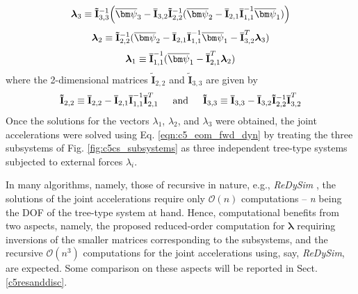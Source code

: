 {	\begin{equation}
	\label{eqn:c5_lamda3_CS}
	\mbox{\boldmath$\lambda$}_3 \equiv \mathbf{\tilde{I}}_{3,3}^{-1}\Big(\mbox{$\overline{\bm\psi}_3$} - \mathbf{\overline{I}}_{3,2}\mathbf{\tilde{I}}_{2,2}^{-1}(\mbox{$\overline{\bm\psi}_2$} - \mathbf{\overline{I}}_{2,1} \mathbf{\overline{I}}_{1,1}^{-1}\mbox{$\overline{\bm\psi}_1$})\Big)\\
	\end{equation}
	\begin{equation}
	\label{eqn:c5_lamda2_CS}
	\mbox{\boldmath$\lambda$}_2 \equiv \mathbf{\tilde{I}}_{2,2}^{-1}(\mbox{$\overline{\bm\psi}_2$} - \mathbf{\overline{I}}_{2,1} \mathbf{\overline{I}}_{1,1}^{-1}\mbox{$\overline{\bm\psi}_1$} - \mathbf{\overline{I}}_{3,2}^T\mbox{\boldmath$\lambda$}_3)\\
	\end{equation}
	\begin{equation}
	\label{eqn:c5_lamda1_CS}
	\mbox{\boldmath$\lambda$}_1 \equiv \mathbf{\overline{I}}_{1,1}^{-1}(\mbox{$\overline{\bm\psi}_1$} - \mathbf{\overline{I}}_{2,1}^T\mbox{\boldmath$\lambda$}_2)\\
	\end{equation}
	where the 2-dimensional matrices $\mathbf{\tilde{I}}_{2,2}$ and $\mathbf{\tilde{I}}_{3,3}$ are given by
	\vspace{-10pt}
	\begin{equation}
	\label{eqn:c5_Itildadef_cs}
	\mathbf{\tilde{I}}_{2,2} \equiv \mathbf{\overline{I}}_{2,2} - \mathbf{\overline{I}}_{2,1}\mathbf{\overline{I}}_{1,1}^{-1}\mathbf{\overline{I}}_{2,1}^T \hspace*{15pt} \textnormal{and} \hspace*{15pt} \mathbf{\tilde{I}}_{3,3} \equiv \mathbf{\overline{I}}_{3,3} - \mathbf{\overline{I}}_{3,2}\mathbf{\tilde{I}}_{2,2}^{-1}\mathbf{\overline{I}}_{3,2}^T
	\vspace{-10pt}
	\end{equation}
Once the solutions for the vectors \mbox{\boldmath$\lambda$}$_1$, \mbox{\boldmath$\lambda$}$_2$, and \mbox{\boldmath$\lambda$}$_3$ were obtained, the joint accelerations were solved using Eq. \ref{eqn:c5_eom_fwd_dyn} by treating the three subsystems of Fig. \ref{fig:c5cs_subsystems} as three independent tree-type systems subjected to external forces \mbox{\boldmath$\lambda$}$_i$. 

In many algorithms, namely, those of recursive in nature, e.g., \emph{ReDySim} \citep{redysim}, the solutions of the joint accelerations require only $\mathcal{O}(n)$ computations -- \emph{n} being the DOF of the tree-type system at hand. Hence, computational benefits from two aspects, namely, the proposed reduced-order computation for $\bm\lambda$ requiring inversions of the smaller matrices corresponding to the subsystems, and the recursive $\mathcal{O}(n^3)$ computations for the joint accelerations using, say, \emph{ReDySim}, are expected. Some comparison on these aspects will be reported in Sect. \ref{c5resanddisc}.

}
